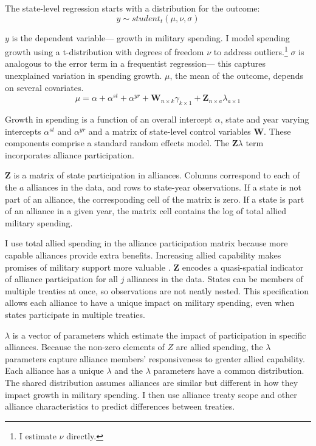 \documentclass[12pt]{article}
\begin{document}
The state-level regression starts with a distribution for the outcome:
\begin{equation}
y \sim student_t(\mu, \nu, \sigma)
\end{equation}
 

$y$ is the dependent variable--- growth in military spending. 
I model spending growth using a t-distribution with degrees of freedom $\nu$ to address outliers.\footnote{I estimate $\nu$ directly.}
$\sigma$ is analogous to the error term in a frequentist regression--- this captures unexplained variation in spending growth.  
$\mu$, the mean of the outcome, depends on several covariates.
\begin{equation}
\mu = \alpha + \alpha^{st} + \alpha^{yr} +\textbf{W}_{n \times k} \gamma_{k \times 1}  + \textbf{Z}_{n \times a} \lambda_{a \times 1} 
\end{equation}


Growth in spending is a function of an overall intercept $\alpha$, state and year varying intercepts $\alpha^{st}$ and $\alpha^{yr}$ and a matrix of state-level control variables $\textbf{W}$.
These components comprise a standard random effects model. 
The $\textbf{Z} \lambda$ term incorporates alliance participation.


$\textbf{Z}$ is a matrix of state participation in alliances. 
Columns correspond to each of the $a$ alliances in the data, and rows to state-year observations. 
If a state is not part of an alliance, the corresponding cell of the matrix is zero.
If a state is part of an alliance in a given year, the matrix cell contains the log of total allied military spending.


I use total allied spending in the alliance participation matrix because more capable alliances provide extra benefits.
Increasing allied capability makes promises of military support more valuable \citep{Johnsonetal2015}.  
$\textbf{Z}$ encodes a quasi-spatial indicator of alliance participation for all $j$ alliances in the data. 
States can be members of multiple treaties at once, so observations are not neatly nested. 
This specification allows each alliance to have a unique impact on military spending, even when states participate in multiple treaties. 


$\lambda$ is a vector of parameters which estimate the impact of participation in specific alliances. 
Because the non-zero elements of $Z$ are allied spending, the $\lambda$ parameters capture alliance members' responsiveness to greater allied capability. 
Each alliance has a unique $\lambda$ and the $\lambda$ parameters have a common distribution. 
The shared distribution assumes alliances are similar but different in how they impact growth in military spending. 
I then use alliance treaty scope and other alliance characteristics to predict differences between treaties. 
\end{document}
